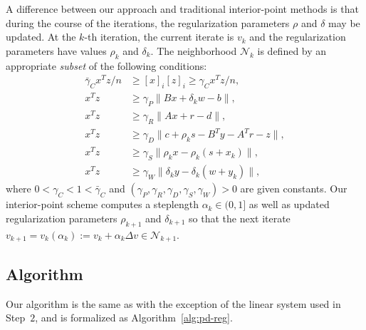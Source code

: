 \documentclass{amsart}
\begin{document}
A difference
between our approach and traditional interior-point methods is that during the
course of the iterations, the regularization parameters $\rho$ and $\delta$ may
be updated. At the $k$-th iteration, the current iterate is $v_k$ and the
regularization parameters have values $\rho_k$ and $\delta_k$. The neighborhood
$\mathcal{N}_k$ is defined by an appropriate \textit{subset} of the following
conditions:
\begin{subequations}
  \label{eq:neighborhood}
  \begin{align}
    \bar{\gamma}_C x^T z / n & \geq [x]_i [z]_i \geq \gamma_C x^T z / n,
    \label{eq:centrality} \\
    x^T z & \geq \gamma_P \|Bx + \delta_k w - b\|, \label{eq:pFeas} \\
    x^T z & \geq \gamma_R \|Ax + r - d\|, \label{eq:lsqFeas} \\
    x^T z & \geq \gamma_D \|c + \rho_k s - B^T y - A^T r - z\|,
    \label{eq:dFeas} \\
    x^T z & \geq \gamma_S \|\rho_k x - \rho_k(s + x_k)\|, \label{eq:sx} \\
    x^T z & \geq \gamma_W \|\delta_k y - \delta_k (w + y_k)\|,
    \label{eq:yw}
\end{align}
\end{subequations}
where $0 < \gamma_C < 1 < \bar{\gamma}_C$ and $(\gamma_P, \gamma_R, \gamma_D,
\gamma_S,\gamma_W) > 0$ are given constants. Our interior-point scheme computes
a steplength $\alpha_k \in (0,1]$ as well as updated regularization parameters
$\rho_{k+1}$ and $\delta_{k+1}$ so that the next iterate $v_{k+1} =
v_k(\alpha_k) := v_k + \alpha_k \Delta v \in \mathcal{N}_{k+1}$.

\subsection{Algorithm}

Our algorithm is the same as \cite[Algorithm~$4.1$]{friedlander-orban-2012}
with the exception of the linear system used in Step~$2$, and is formalized as
Algorithm~\ref{alg:pd-reg}.
\end{document}
